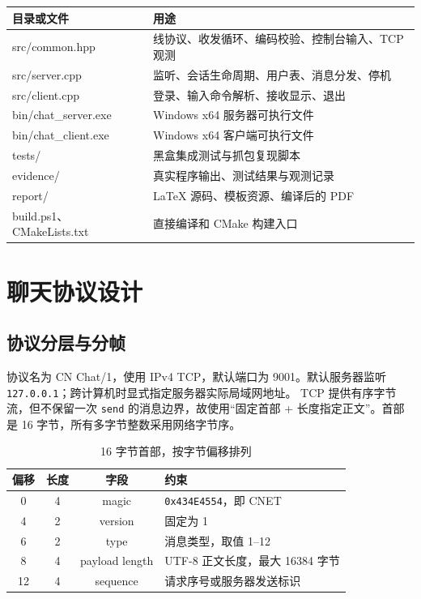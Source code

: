 \documentclass[UTF8,notitlepage,11pt]{ctexart}
\newcommand{\src}[1]{\nolinkurl{#1}}
\begin{document}
\begin{table}[H]\centering\small
\begin{tabularx}{\textwidth}{p{}X}\toprule
目录或文件 & 用途\\\midrule
src/common.hpp & 线协议、收发循环、编码校验、控制台输入、TCP 观测\\
src/server.cpp & 监听、会话生命周期、用户表、消息分发、停机\\
src/client.cpp & 登录、输入命令解析、接收显示、退出\\
bin/chat\_server.exe & Windows x64 服务器可执行文件\\
bin/chat\_client.exe & Windows x64 客户端可执行文件\\
tests/ & 黑盒集成测试与抓包复现脚本\\
evidence/ & 真实程序输出、测试结果与观测记录\\
report/ & LaTeX 源码、模板资源、编译后的 PDF\\
build.ps1、CMakeLists.txt & 直接编译和 CMake 构建入口\\\bottomrule
\end{tabularx}\end{table}

\section{聊天协议设计}\label{sec:protocol}
\subsection{协议分层与分帧}
协议名为 CN Chat/1，使用 IPv4 TCP，默认端口为 9001。默认服务器监听 \src{127.0.0.1}；跨计算机时显式指定服务器实际局域网地址。
TCP 提供有序字节流，但不保留一次 \src{send} 的消息边界，故使用“固定首部 + 长度指定正文”。首部是 16 字节，所有多字节整数采用网络字节序。

\begin{table}[H]\centering
\caption{16 字节首部，按字节偏移排列}
\begin{tabular}{cccl}\toprule
偏移 & 长度 & 字段 & 约束\\\midrule
0 & 4 & magic & \src{0x434E4554}，即 CNET\\
4 & 2 & version & 固定为 1\\
6 & 2 & type & 消息类型，取值 1--12\\
8 & 4 & payload length & UTF-8 正文长度，最大 16384 字节\\
12 & 4 & sequence & 请求序号或服务器发送标识\\\bottomrule
\end{tabular}\end{table}
\end{document}
